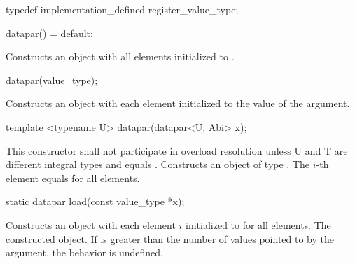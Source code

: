\begin{wgText}
  \begin{itemdecl}
typedef implementation_defined register_value_type;
  \end{itemdecl}
  \begin{itemdescr}
  \end{itemdescr}

  \begin{itemdecl}
datapar() = default;
  \end{itemdecl}
  \begin{itemdescr}
    \pnum
    \effects
    Constructs an object with all elements initialized to .
  \end{itemdescr}

  \begin{itemdecl}
datapar(value_type);
  \end{itemdecl}
  \begin{itemdescr}
    \pnum
    \effects
    Constructs an object with each element initialized to the value of the argument.
  \end{itemdescr}

  \begin{itemdecl}
template <typename U> datapar(datapar<U, Abi> x);
  \end{itemdecl}
  \begin{itemdescr}
    \pnum\remarks This constructor shall not participate in overload resolution unless
                  \type U and \type T are different integral types and
                   equals .
    \pnum\effects Constructs an object of type \datapar.
    \pnum\postcondition The $i$-th element equals  for all elements.
  \end{itemdescr}

  \begin{itemdecl}
static datapar load(const value_type *x);
  \end{itemdecl}
  \begin{itemdescr}
    \pnum \effects Constructs an object with each element $i$ initialized to  for all elements.
    \pnum \returns The constructed object.
    \pnum \remarks If \datapar{} is greater than the number of values pointed to by the argument, the behavior is undefined.
  \end{itemdescr}


\end{wgText}
